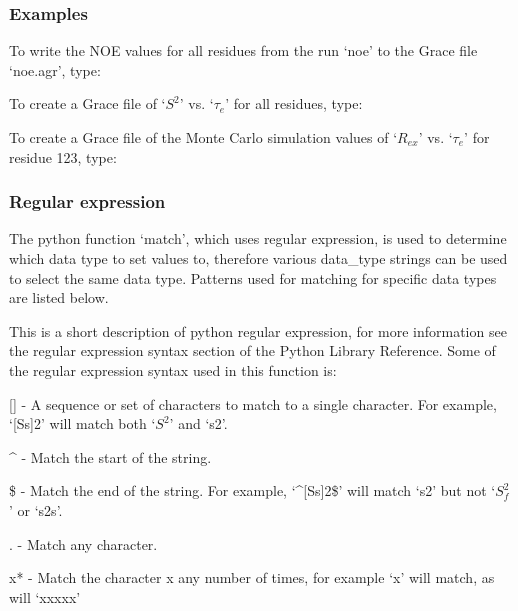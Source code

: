 \subsubsection{Examples}

To write the NOE values for all residues from the run `noe' to the Grace file `noe.agr',
type:



To create a Grace file of `$S^2$' vs. `$\tau_e$' for all residues, type:




To create a Grace file of the Monte Carlo simulation values of `$R_{ex}$' vs. `$\tau_e$' for residue
123, type:






\subsubsection{Regular expression}

The python function `match', which uses regular expression, is used to determine which data
type to set values to, therefore various data\_type strings can be used to select the same
data type.  Patterns used for matching for specific data types are listed below.

This is a short description of python regular expression, for more information see the
regular expression syntax section of the Python Library Reference.  Some of the regular
expression syntax used in this function is:

    [] - A sequence or set of characters to match to a single character.  For example,
    `[Ss]2' will match both `$S^2$' and `s2'.

    \^{} - Match the start of the string.

    \$ - Match the end of the string.  For example, `\^{}[Ss]2\$' will match `s2' but not `$S^2_f$'
    or `s2s'.

    . - Match any character.

    x* - Match the character x any number of times, for example `x' will match, as will
    `xxxxx'

